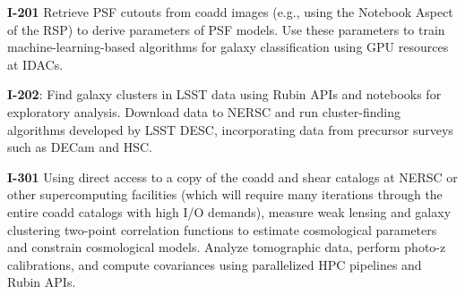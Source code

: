 \textbf{I-201} Retrieve PSF cutouts from coadd images (e.g., using the Notebook Aspect of the RSP) to derive parameters of PSF models.
Use these parameters to train machine-learning-based algorithms for galaxy classification using GPU resources at IDACs.

\textbf{I-202}: Find galaxy clusters in LSST data using Rubin APIs and notebooks for exploratory analysis.
Download data to NERSC and run cluster-finding algorithms developed by LSST DESC, incorporating data from precursor surveys such as DECam and HSC.

\textbf{I-301} Using direct access to a copy of the coadd and shear catalogs at NERSC or other supercomputing facilities (which will require many iterations through the entire coadd catalogs with high I/O demands), measure weak lensing and galaxy clustering two-point correlation functions to estimate cosmological parameters and constrain cosmological models.
Analyze tomographic data, perform photo-z calibrations, and compute covariances using parallelized HPC pipelines and Rubin APIs.
